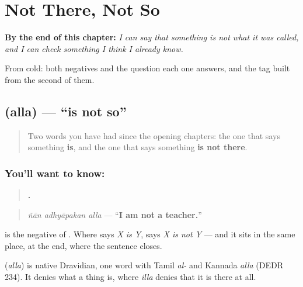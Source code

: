 
\chapter{Not There, Not So}
\label{ch:ml-alla}

\begin{chapteropening}
\textbf{By the end of this chapter:} \emph{I can say that something is not what it was called, and I can check something I think I already know.}

From cold: both negatives and the question each one answers, and the tag built from the second of them.
\end{chapteropening}

\section[\texorpdfstring{\ml{അല്ല} (alla)}{അല്ല (alla)}]{ (alla) — \textquotedblleft{}is not so\textquotedblright{}}

\label{lesson:ML-C77-alla}



\begin{quote}
Two words you have had since the opening chapters: the one that says something \textbf{is}, and the one that says something \textbf{is not there}.
\end{quote}

\subsection*{You'll want to know: }
\begin{quote}
\textbf{  .}
\end{quote}

\begin{quote}
\emph{ñān adhyāpakan alla} — \textquotedblleft{}\textbf{I am not a teacher.}\textquotedblright{}
\end{quote}

\textbf{} is the negative of \textbf{}. Where  says \emph{X is Y},  says \emph{X is not Y} — and it sits in the same place, at the end, where the sentence closes.

\begin{cousinweb}
\textbf{} (\emph{alla}) is native Dravidian, one word with Tamil \emph{al-} and Kannada \emph{alla} (DEDR 234). It denies what a thing is, where \emph{illa} denies that it is there at all.
\end{cousinweb}


